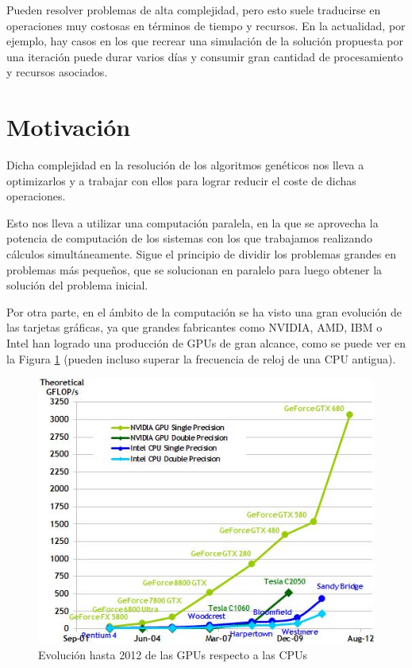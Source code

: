 \bigskip
Pueden resolver problemas de alta complejidad, pero esto suele traducirse en operaciones muy costosas en términos de tiempo y recursos. En la actualidad, por ejemplo, hay casos en los que recrear una simulación de la solución propuesta por una iteración puede durar varios días y consumir gran cantidad de procesamiento y recursos asociados.


\bigskip
\section{Motivación}
\bigskip

Dicha complejidad en la resolución de los algoritmos genéticos nos lleva a optimizarlos y a trabajar con ellos para lograr reducir el coste de dichas operaciones. 

Esto nos lleva a utilizar una computación paralela, en la que se aprovecha la potencia de computación de los sistemas con los que trabajamos realizando cálculos simultáneamente. Sigue el principio de dividir los problemas grandes en problemas más pequeños, que se solucionan en paralelo para luego obtener la solución del problema inicial.

Por otra parte, en el ámbito de la computación se ha visto una gran evolución de las tarjetas gráficas, ya que grandes fabricantes como NVIDIA, AMD, IBM o Intel han logrado una producción de GPUs de gran alcance, como se puede ver en la Figura \ref{fig:gpu_vs_cpu} (pueden incluso superar la frecuencia de reloj de una CPU antigua).

\bigskip
\begin{figure}[h]
	\centering
	\includegraphics[width=0.7\linewidth]{../images/gpu_vs_cpu}
	\caption[Evolución de las GPUs respecto a las CPUs]{Evolución hasta 2012 de las GPUs respecto a las CPUs}
	\label{fig:gpu_vs_cpu}
\end{figure}


